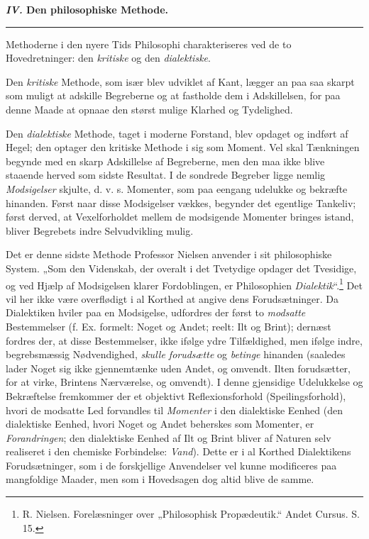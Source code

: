 \documentclass[12pt,a4paper]{book}
\newcommand{\opage}[1]{\marginnote{\footnotesize\textit{[#1]}}}
\begin{document}
\begin{center}\textbf{\textit{IV.} Den philosophiske Methode.}\end{center}

\begin{center}\rule{2em}{0.4pt}\end{center}

Methoderne i den nyere Tids Philosophi charakteriseres ved de to Hovedretninger: den \emph{kritiske} og den
\emph{dialektiske}.

Den \emph{kritiske} Methode, som især blev udviklet af
Kant, lægger an paa saa skarpt som muligt at adskille
Begreberne og at fastholde dem i Adskillelsen, for paa
denne Maade at opnaae den størst mulige Klarhed og
Tydelighed.

Den \emph{dialektiske} Methode, taget i moderne Forstand, blev opdaget og indført af Hegel; den optager
den kritiske Methode i sig som Moment. Vel skal Tænkningen begynde med en skarp Adskillelse af Begreberne,
men den maa ikke blive staaende herved som sidste Resultat. I de sondrede Begreber ligge nemlig \emph{Modsigelser} skjulte, d. v. s. Momenter, som paa eengang
udelukke og bekræfte hinanden. Først naar disse Mod\opage{90}\setcounter{footnote}{0}sigelser vækkes, begynder det egentlige Tankeliv; først
derved, at Vexelforholdet mellem de modsigende Momenter bringes istand, bliver Begrebets indre Selvudvikling
mulig.

Det er denne sidste Methode Professor Nielsen anvender i sit philosophiske System. „Som den Videnskab,
der overalt i det Tvetydige opdager det Tvesidige, og
ved Hjælp af Modsigelsen klarer Fordoblingen, er Philosophien \emph{Dialektik}“.\footnote{R. Nielsen. Forelæsninger over „Philosophisk Propædeutik.“
Andet Cursus. S. 15.} Det vil her ikke være overflødigt i al Korthed at angive dens Forudsætninger.
Da Dialektiken hviler paa en Modsigelse, udfordres der
først to \emph{modsatte} Bestemmelser (f. Ex. formelt: Noget
og Andet; reelt: Ilt og Brint); dernæst fordres der, at
disse Bestemmelser, ikke ifølge ydre Tilfældighed, men
ifølge indre, begrebsmæssig Nødvendighed, \emph{skulle forudsætte} og \emph{betinge} hinanden (saaledes lader Noget
sig ikke gjennemtænke uden Andet, og omvendt. Ilten
forudsætter, for at virke, Brintens Nærværelse, og omvendt). I denne gjensidige Udelukkelse og Bekræftelse
fremkommer der et objektivt Reflexionsforhold (Speilingsforhold), hvori de modsatte Led forvandles til
\emph{Momenter} i den dialektiske Eenhed (den dialektiske
Eenhed, hvori Noget og Andet beherskes som Momenter,
er \emph{Forandringen}; den dialektiske Eenhed af Ilt og
Brint bliver af Naturen selv realiseret i den chemiske
Forbindelse: \emph{Vand}). Dette er i al Korthed Dialektikens
Forudsætninger, som i de forskjellige Anvendelser vel
\opage{91}\setcounter{footnote}{0}%
kunne modificeres paa mangfoldige Maader, men som i
Hovedsagen dog altid blive de samme.
\end{document}
